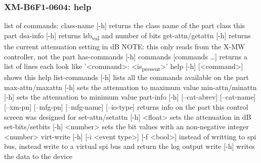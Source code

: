 \documentclass[11pt]{article}
\begin{document}
\subsubsection{XM-B6F1-0604: help}
\label{sec:orgda1c328}
list of commands:
  class-name [-h]
    returns the class name of the part class this part
  dsa-info [-h]
    returns lsb\textsubscript{val} and number of bits
  get-attn/getattn [-h]
    returns the current attenuation setting in dB
    NOTE: this only reads from the X-MW controller, not the part
  has-commands [-h] commands [commands \ldots{}]
    returns a list of lines each look like '<command>: <is\textsubscript{present}>'
  help [-h] [<command>]
    shows this help
  list-commands [-h]
    lists all the commands available on the part
  max-attn/maxattn [-h]
    sets the attenuation to maximum value
  min-attn/minattn [-h]
    sets the attenuation to minimum value
  part-info  [-h] [--cat-abrev] [--cat-name] [--xm-pn] [--mfg-pn] [--mfg-name]
          [--io-type]
    returns info on the part this control screen was designed for
  set-attn/setattn [-h] <float>
    sets the attenuation in dB
  set-bits/setbits [-h] <number>
    sets the bit values with an non-negative integer <number>
  virt-write [-h] [-i <event type>] [-f <bool>]
    instead of writting to spi bus, instead write to a virtual spi bus
    and return the log output
  write [-h]
    writes the data to the device
\end{document}
